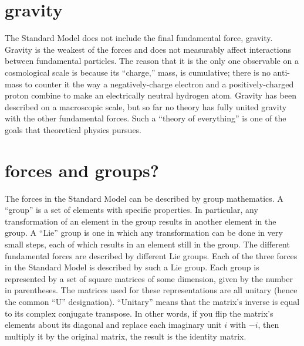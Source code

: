 \section{gravity}
The Standard Model does not include the final 
fundamental force, gravity.  
Gravity is the weakest of the forces and does not 
measurably affect interactions between fundamental particles.  
The reason that it is the only one observable on a 
cosmological scale is because its ``charge,'' mass, 
is cumulative; there is no anti-mass to counter it 
the way a negatively-charge electron and a positively-charged 
proton combine to make an electrically neutral hydrogen atom.  
Gravity has been described on a macroscopic scale, but 
so far no theory has fully united gravity with the 
other fundamental forces.  
Such a ``theory of everything'' is 
one of the goals that 
theoretical physics %
pursues.  





\section{forces and groups?}


The forces in the Standard Model can be described 
by group mathematics.  
A ``group'' is a set of elements with specific properties.  
In particular, any transformation of an element in the group 
results in another element in the group.  
A ``Lie'' group is one in which any transformation %
can be done in very small steps, 
each of which results in an element still in the group.  
The different fundamental forces are described by different Lie groups.  
Each of the three forces in the Standard Model 
is described by such a Lie group.  %
Each group is represented by a set of square matrices 
of some dimension, given by the number in parentheses.  
The matrices used for these representations are 
all unitary (hence the common ``U'' designation).  
``Unitary'' means that the matrix's inverse 
is equal to its complex conjugate transpose.  
In other words, if you flip the matrix's elements 
about its diagonal and replace each imaginary unit $i$ 
with $-i$, then multiply it by the original matrix, 
the result is the identity matrix.   %

